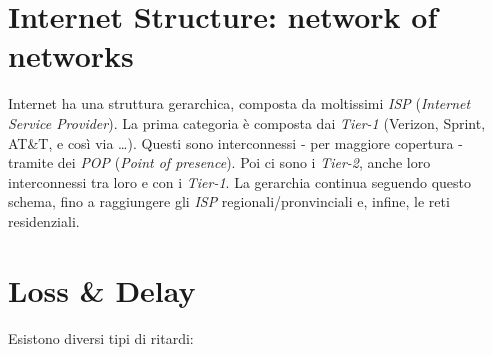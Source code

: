 \section{Internet Structure: network of networks}
Internet ha una struttura gerarchica, composta da moltissimi \textit{ISP} (\textit{Internet Service Provider}).
La prima categoria è composta dai \textit{Tier-1} (Verizon, Sprint, AT\&T, e così via \ldots). Questi sono interconnessi - per maggiore copertura - tramite dei \textit{POP} (\textit{Point of presence}).
Poi ci sono i \textit{Tier-2}, anche loro interconnessi tra loro e con i \textit{Tier-1}.
La gerarchia continua seguendo questo schema, fino a raggiungere gli \textit{ISP} regionali/pronvinciali e, infine, le reti residenziali.
\newpage

\section{Loss \& Delay}
Esistono diversi tipi di ritardi:
